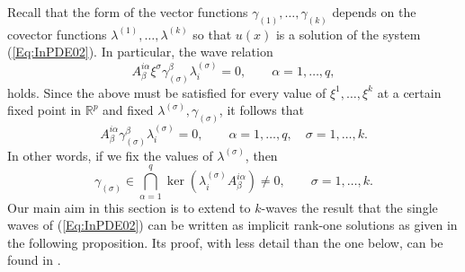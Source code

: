 \documentclass{birkjour}
\theoremstyle{definition}
\theoremstyle{remark}
\numberwithin{equation}{section}
\numberwithin{equation}{section}
\numberwithin{thm}{section}
\numberwithin{equation}{section}
\numberwithin{thm}{section}
\begin{document}
Recall that the form of the vector functions $\gamma_{(1)},\ldots,\gamma_{(k)}$ depends on the covector functions $\lambda^{(1)},\ldots,\lambda^{(k)}$ so that $u(x)$ is a solution of the system (\ref{Eq:InPDE02}). In particular, the wave relation
\begin{equation}
	A^{i\alpha}_\beta\xi^\sigma\gamma^\beta_{(\sigma)}\lambda^{(\sigma)}_i=0,\qquad \alpha=1,\ldots,q, 
\end{equation}
holds. Since the above must be satisfied for every value of $\xi^1,\ldots,\xi^k$ at a certain fixed point in $\mathbb{R}^p$ and fixed $\lambda^{(\sigma)},\gamma_{(\sigma)}$, it follows that
\begin{equation}
	\label{Rel:GammaDelta}
	A^{i\alpha}_\beta\gamma^\beta_{(\sigma)}\lambda^{(\sigma)}_i=0,\qquad \alpha=1,\ldots,q, \quad \sigma=1,\ldots,k.
\end{equation}
In other words, if we fix the values of $\lambda^{(\sigma)}$, then 
\begin{equation}%
	\gamma_{(\sigma)}\in \bigcap_{\alpha=1}^q\ker (\lambda^{(\sigma)}_iA_\beta^{i\alpha})\neq0,
	\qquad \sigma=1,\ldots,k.\end{equation}
Our main aim in this section is to extend  to  $k$-waves the result that the single waves of (\ref{Eq:InPDE02}) can be written as implicit rank-one solutions as given in the following proposition. Its proof, with less detail than the one below, can be found in \cite{GL91}.
\end{document}
